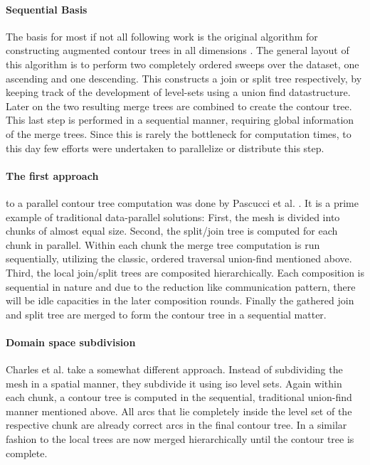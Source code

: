 \documentclass{scrartcl}
\begin{document}
\paragraph{Sequential Basis} 
The basis for most if not all following work is the original algorithm for constructing augmented contour trees in all dimensions \cite{orig}. The general layout of this algorithm is to perform two completely ordered sweeps over the dataset, one ascending and one descending. This constructs a join or split tree respectively, by keeping track of the development of level-sets using a union find datastructure. Later on the two resulting merge trees are combined to create the contour tree. This last step is performed in a sequential manner, requiring global information of the merge trees. Since this is rarely the bottleneck for computation times, to this day few efforts were undertaken to parallelize or distribute this step.

\paragraph{The first approach} to a parallel contour tree computation was done by Pascucci et al. \cite{pascucci1}. It is a prime example of traditional data-parallel solutions: First, the mesh is divided into chunks of almost equal size. Second, the split/join tree is computed for each chunk in parallel. Within each chunk the merge tree computation is run sequentially, utilizing the classic, ordered traversal union-find mentioned above. Third, the local join/split trees are composited hierarchically. Each composition is sequential in nature and due to the reduction like communication pattern, there will be idle capacities in the later composition rounds. Finally the gathered join and split tree are merged to form the contour tree in a sequential matter.

\paragraph{Domain space subdivision}
Charles et al. \cite{Charles} take a somewhat different approach. Instead of subdividing the mesh in a spatial manner, they subdivide it using iso level sets. Again within each chunk, a contour tree is computed in the sequential, traditional union-find manner mentioned above. All arcs that lie completely inside the level set of the respective chunk are already correct arcs in the final contour tree. In a similar fashion to \cite{pascucci1} the local trees are now merged hierarchically until the contour tree is complete. 
\end{document}
